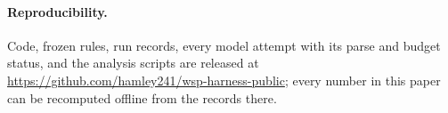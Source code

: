 \documentclass{article}
\begin{document}
\paragraph{Reproducibility.} Code, frozen rules, run records, every model attempt with its parse and budget status, and the analysis scripts are released at \url{https://github.com/hamley241/wsp-harness-public}; every number in this paper can be recomputed offline from the records there.



\end{document}
